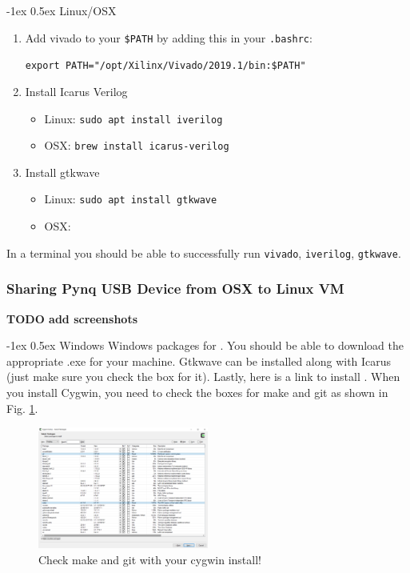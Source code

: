 \documentclass[11pt]{article}
\makeatletter
\renewcommand{\subsection}
{\@startsection {subsection}{1}{0pt}
 {-1ex}
 {0.5ex}
 {\bfseries\normalsize}}
\makeatother
\begin{document}
\subsection{Linux/OSX}
\begin{enumerate}
  \item Add vivado to your \verb|$PATH| by adding this in your \verb|.bashrc|:

    \verb|export PATH="/opt/Xilinx/Vivado/2019.1/bin:$PATH"|
  \item Install Icarus Verilog
    \begin{itemize}
      \item Linux: \verb|sudo apt install iverilog|
      \item OSX: \verb|brew install icarus-verilog|
    \end{itemize}

  \item Install gtkwave
    \begin{itemize}
      \item Linux: \verb|sudo apt install gtkwave|
      \item OSX: \href{https://sourceforge.net/projects/gtkwave/files/gtkwave-3.3.100-osx-app/gtkwave.zip/download}{\color{blue}{Download the app}}
    \end{itemize}
\end{enumerate}

In a terminal you should be able to successfully run \verb|vivado|, \verb|iverilog|, \verb|gtkwave|.

\subsubsection{Sharing Pynq USB Device from OSX to Linux VM}
\textbf{TODO add screenshots}

\subsection{Windows}
Windows packages for \href{http://bleyer.org/icarus/}{\color{blue}{Icarus are available}}. You should be able to download the appropriate .exe for your machine. Gtkwave can be installed along with Icarus (just make sure you check the box for it). Lastly, here is a link to install \href{https://www.cygwin.com/install.html}{\color{blue}{Cygwin}}. When you install Cygwin, you need to check the boxes for make and git as shown in Fig. \ref{fig:cygwin}.

\begin{figure}[ht]
  \centering
  \includegraphics[width=0.5\textwidth]{figs/cygwin_install.png}
  \caption{Check make and git with your cygwin install!}
  \label{fig:cygwin}
\end{figure}
\end{document}
